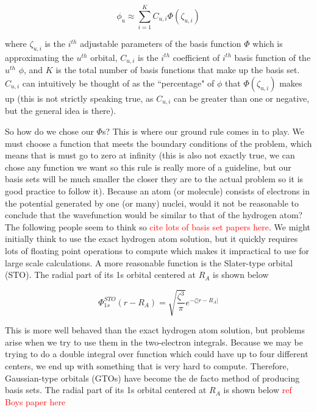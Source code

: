 \documentclass[12pt]{report}
\newcommand{\notetodylan}[1]{\textcolor{red}{#1}} %
\begin{document}
\begin{equation}
\label{eq:linear_comb_bs}
\phi_{u} \approx \sum^{K}_{i=1}C_{u,i}\Phi(\zeta_{u,i})
\end{equation}

where $\zeta_{u,i}$ is the $i^{th}$ adjustable parameters of the basis function $\Phi$ which is approximating the $u^{th}$ orbital, $C_{u,i}$ is the $i^{th}$ coefficient of $i^{th}$ basis function of the $u^{th}$ $\phi$, and $K$ is the total number of basis functions that make up the basis set. $C_{u,i}$ can intuitively be thought of as the ``percentage" of $\phi$ that $\Phi(\zeta_{u,i})$ makes up (this is not strictly speaking true, as $C_{u,i}$ can be greater than one or negative, but the general idea is there).

So how do we chose our $\Phi$s? This is where our ground rule comes in to play. We must choose a function that meets the boundary conditions of the problem, which means that is must go to zero at infinity (this is also not exactly true, we can chose any function we want so this rule is really more of a guideline, but our basis sets will be much smaller the closer they are to the actual problem so it is good practice to follow it). Because an atom (or molecule) consists of electrons in the potential generated by one (or many) nuclei, would it not be reasonable to conclude that the wavefunction would be similar to that of the hydrogen atom? The following people seem to think so \notetodylan{cite lots of basis set papers here}. We might initially think to use the exact hydrogen atom solution, but it quickly requires lots of floating point operations to compute which makes it impractical to use for large scale calculations. A more reasonable function is the Slater-type orbital (STO). The radial part of its 1s orbital centered at $R_{A}$ is shown below

\begin{equation}
\label{eq:sto_1s}
\Phi^{STO}_{1s}(r - R_{A}) = \sqrt{\frac{\zeta^{3}}{\pi}}e^{-\zeta|r- R_{A}|}
\end{equation}

This is more well behaved than the exact hydrogen atom solution, but problems arise when we try to use them in the two-electron integrals. Because we may be trying to do a double integral over function which could have up to four different centers, we end up with something that is very hard to compute. Therefore, Gaussian-type orbitals (GTOs) have become the de facto method of producing basis sets. The radial part of its 1s orbital centered at $R_{A}$ is shown below \notetodylan{ref Boys paper here}
\end{document}
